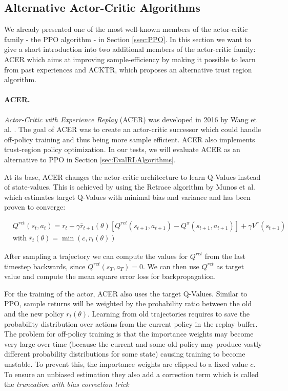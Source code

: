 \subsection{Alternative Actor-Critic Algorithms} \label{ssec:AlternativeCombinedMethods}
We already presented one of the most well-known members of the actor-critic family - the PPO algorithm - in Section \ref{ssec:PPO}. In this section we want to give a short introduction into two additional members of the actor-critic family: ACER which aims at improving sample-efficiency by making it possible to learn from past experiences and ACKTR, which proposes an alternative trust region algorithm. 

\paragraph{ACER.}
\textit{Actor-Critic with Experience Replay} (ACER) was developed in 2016 by Wang et al. \cite{wang2016sample}. The goal of ACER was to create an actor-critic successor which could handle off-policy training and thus being more sample efficient. ACER also implements trust-region policy optimization. In our tests, we will evaluate ACER as an alternative to PPO in Section \ref{sec:EvalRLAlgorithms}.

At its base, ACER changes the actor-critic architecture to learn Q-Values instead of state-values. This is achieved by using the Retrace algorithm by Munos et al. \cite{munos2016safe} which estimates target Q-Values with minimal bias and variance and has been proven to converge:

\begin{align*}
  &Q^{ret}(s_t, a_t) = r_t + \gamma \bar{r}_{t+1}(\theta) \left[Q^{ret}(s_{t+1}, a_{t+1}) - Q^\pi(s_{t+1}, a_{t+1})\right] + \gamma V^\pi(s_{t+1}) \\
  &\text{with } \bar{r}_t(\theta) = \min(c, r_t(\theta))
\end{align*}

After sampling a trajectory we can compute the values for $Q^{ret}$ from the last timestep backwards, since $Q^{ret}(s_T, a_T) = 0$. We can then use $Q^{ret}$ as target value and compute the mean square error loss for backpropagation. 

For the training of the actor, ACER also uses the target Q-Values. Similar to PPO, sample returns will be weighted by the probability ratio between the old and the new policy $r_t(\theta)$. Learning from old trajectories requires to save the probability distribution over actions from the current policy in the replay buffer. The problem for off-policy training is that the importance weights may become very large over time (because the current and some old policy may produce vastly different probability distributions for some state) causing training to become unstable. To prevent this, the importance weights are clipped to a fixed value $c$. To ensure an unbiased estimation they also add a correction term which is called the \textit{truncation with bias correction trick} 

